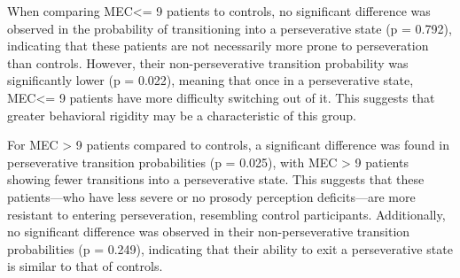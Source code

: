 When comparing MEC<= 9 patients to controls, no significant difference was observed in the probability of transitioning into a perseverative state (p = 0.792), indicating that these patients are not necessarily more prone to perseveration than controls. However, their non-perseverative transition probability was significantly lower (p = 0.022), meaning that once in a perseverative state, MEC<= 9 patients have more difficulty switching out of it. This suggests that greater behavioral rigidity may be a characteristic of this group.

For MEC > 9 patients compared to controls, a significant difference was found in perseverative transition probabilities (p = 0.025), with MEC > 9 patients showing fewer transitions into a perseverative state. This suggests that these patients—who have less severe or no prosody perception deficits—are more resistant to entering perseveration, resembling control participants. Additionally, no significant difference was observed in their non-perseverative transition probabilities (p = 0.249), indicating that their ability to exit a perseverative state is similar to that of controls.


